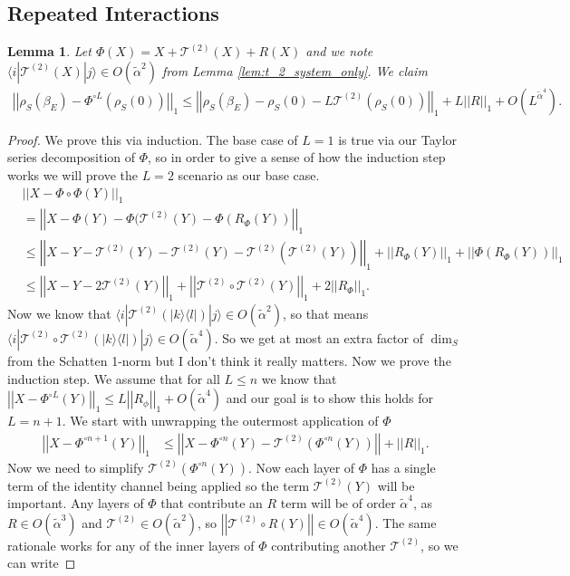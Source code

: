 \documentclass{article}
\newtheorem{lemma}[theorem]{Lemma}
\newcommand{\ket}[1]{|#1\rangle}
\newcommand{\bra}[1]{\langle #1|}
\newcommand{\ketbra}[2]{| #1\rangle\! \langle #2|}
\newcommand{\norm}[1]{\left| \left| #1 \right| \right|}
\newcommand{\bigo}[1]{O\left( #1 \right)}
\begin{document}
\subsection{Repeated Interactions}
\begin{lemma} \label{lem:repeated_interactions_l}
    Let $\Phi(X) = X + \mathcal{T}^{(2)}(X) + R(X)$ and we note $\bra{i} \mathcal{T}^{(2)}(X)\ket{j} \in \bigo{\widetilde{\alpha}^2}$ from Lemma \ref{lem:t_2_system_only}. We claim
    \begin{align}
        \norm{\rho_S(\beta_E) - \Phi^{\circ L}(\rho_S(0))}_1 \leq \norm{\rho_S(\beta_E) - \rho_S(0) - L \mathcal{T}^{(2)}(\rho_S(0))}_1 + L \norm{R}_1 + \bigo{L^ \widetilde{\alpha}^4}.
    \end{align}
\end{lemma}
\begin{proof}
 We prove this via induction. The base case of $L=1$ is true via our Taylor series decomposition of $\Phi$, so in order to give a sense of how the induction step works we will prove the $L=2$ scenario as our base case.    
 \begin{align}
    &\norm{X - \Phi \circ \Phi (Y)}_1\\
    & = \norm{X - \Phi(Y) - \Phi(\mathcal{T}^{(2)}(Y) - \Phi(R_{\Phi}(Y))}_1 \\
    &\leq \norm{X - Y - \mathcal{T}^{(2)}(Y) - \mathcal{T}^{(2)}(Y) - \mathcal{T}^{(2)}(\mathcal{T}^{(2)}(Y))}_1 + \norm{R_{\Phi}(Y)}_1 + \norm{\Phi(R_{\Phi}(Y))}_1 \\
    &\leq \norm{X - Y - 2 \mathcal{T}^{(2)}(Y)}_1 + \norm{\mathcal{T}^{(2)} \circ \mathcal{T}^{(2)}(Y)}_1 + 2 \norm{R_{\Phi}}_1.
\end{align}
Now we know that $\bra{i}\mathcal{T}^{(2)}(\ketbra{k}{l})\ket{j} \in \bigo{\widetilde{\alpha}^2}$, so that means $\bra{i}\mathcal{T}^{(2)}\circ \mathcal{T}^{(2)}(\ketbra{k}{l})\ket{j} \in \bigo{\widetilde{\alpha}^4}$. So we get at most an extra factor of $\dim_S$ from the Schatten 1-norm but I don't think it really matters.  
Now we prove the induction step. We assume that for all $L \le n$ we know that $\norm{X - \Phi^{\circ L}(Y)}_1 \le L \norm{R_{\phi}}_1 + \bigo{\widetilde{\alpha}^4}$ and our goal is to show this holds for $L = n + 1$. We start with unwrapping the outermost application of $\Phi$
\begin{align}
    \norm{X - \Phi^{\circ n + 1}(Y)}_1 &\le \norm{X - \Phi^{\circ n}(Y) - \mathcal{T}^{(2)}(\Phi^{\circ n}(Y))} + \norm{R}_1.
\end{align}
Now we need to simplify $\mathcal{T}^{(2)}(\Phi^{\circ n}(Y))$. Now each layer of $\Phi$ has a single term of the identity channel being applied so the term $\mathcal{T}^{(2)}(Y)$ will be important. Any layers of $\Phi$ that contribute an $R$ term will be of order $\widetilde{\alpha}^4$, as $R \in \bigo{\widetilde{\alpha}^3}$ and $\mathcal{T}^{(2)} \in \bigo{\widetilde{\alpha}^2}$, so $\norm{\mathcal{T}^{(2)} \circ R(Y)} \in \bigo{\widetilde{\alpha}^4}$. The same rationale works for any of the inner layers of $\Phi$ contributing another $\mathcal{T}^{(2)}$, so we can write

\end{proof}
\end{document}
